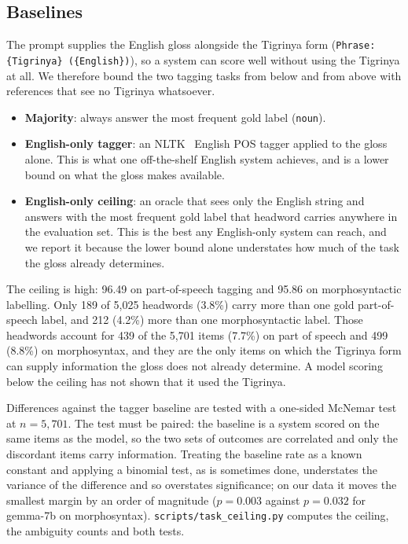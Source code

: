 \documentclass[11pt]{article}
\begin{document}
\subsection{Baselines}
\label{subsec:baselines}

The prompt supplies the English gloss alongside the Tigrinya form
(\texttt{Phrase: \{Tigrinya\} (\{English\})}), so a system can score well
without using the Tigrinya at all. We therefore bound the two tagging tasks
from below and from above with references that see no Tigrinya whatsoever.

\begin{itemize}
  \item \textbf{Majority}: always answer the most frequent gold label
    (\texttt{noun}).
  \item \textbf{English-only tagger}: an NLTK~\citep{loper-bird-2002-nltk}
    English POS tagger applied to the gloss alone. This is what one
    off-the-shelf English system achieves, and is a lower bound on what the
    gloss makes available.
  \item \textbf{English-only ceiling}: an oracle that sees only the
    English string and answers with the most frequent gold label that
    headword carries anywhere in the evaluation set. This is the best any
    English-only system can reach, and we report it because the lower bound
    alone understates how much of the task the gloss already determines.
\end{itemize}

The ceiling is high: 96.49 on part-of-speech tagging and 95.86 on
morphosyntactic labelling. Only 189 of 5,025 headwords (3.8\%) carry more
than one gold part-of-speech label, and 212 (4.2\%) more than one
morphosyntactic label. Those headwords account for 439 of the 5,701 items
(7.7\%) on part of speech and 499 (8.8\%) on morphosyntax, and they are the
only items on which the Tigrinya form can supply information the gloss does
not already determine. A model scoring below the ceiling has not shown that
it used the Tigrinya.

Differences against the tagger baseline are tested with a one-sided McNemar
test at $n = 5{,}701$. The test must be paired: the baseline is a system
scored on the same items as the model, so the two sets of outcomes are
correlated and only the discordant items carry information. Treating the
baseline rate as a known constant and applying a binomial test, as is
sometimes done, understates the variance of the difference and so overstates
significance; on our data it moves the smallest margin by an order of
magnitude ($p = 0.003$ against $p = 0.032$ for gemma-7b on morphosyntax).
\texttt{scripts/task\_ceiling.py} computes the ceiling, the ambiguity counts
and both tests.
\end{document}
